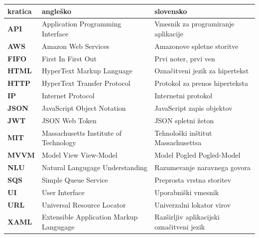 \documentclass[a4paper, 12pt]{book}
\newcommand{\clearemptydoublepage}{\newpage{\pagestyle{empty}\cleardoublepage}}
\begin{document}
\noindent\begin{tabular}{p{}|p{}|p{}}    %
  {\bf kratica} & {\bf angleško}                             & {\bf slovensko} \\ \hline
  {\bf API} & Application Programming Interface & Vmesnik za programiranje aplikacije \\
  {\bf AWS} & Amazon Web Services & Amazonove spletne storitve \\
  {\bf FIFO} & First In First Out & Prvi noter, prvi ven \\
  {\bf HTML} & HyperText Markup Language & Označitveni jezik za hipertekst \\
  {\bf HTTP} & HyperText Transfer Protocol & Protokol za prenos hiperteksta \\
  {\bf IP} & Internet Protocol & Internetni protokol \\
  {\bf JSON} & JavaScript Object Notation & JavaScript zapis objektov\\
  {\bf JWT} & JSON Web Token & JSON spletni žeton \\
  {\bf MIT} & Massachusetts Institute of Technology & Tehnološki inštitut Massachusettsa \\
  {\bf MVVM} & Model View View-Model & Model Pogled Pogled-Model \\
  {\bf NLU} & Natural Langugage Understanding & Razumevanje naravnega govora \\
  {\bf SQS} & Simple Queue Service & Preprosta vrstna storitev \\
  {\bf UI} & User Interface & Uporabniški vmesnik \\
  {\bf URL} & Universal Resource Locator & Univerzalni lokator virov \\
  {\bf XAML} & Extensible Application Markup Langugage & Razširljiv aplikacijski označitveni jezik \\
\end{tabular}


\clearemptydoublepage
\end{document}
